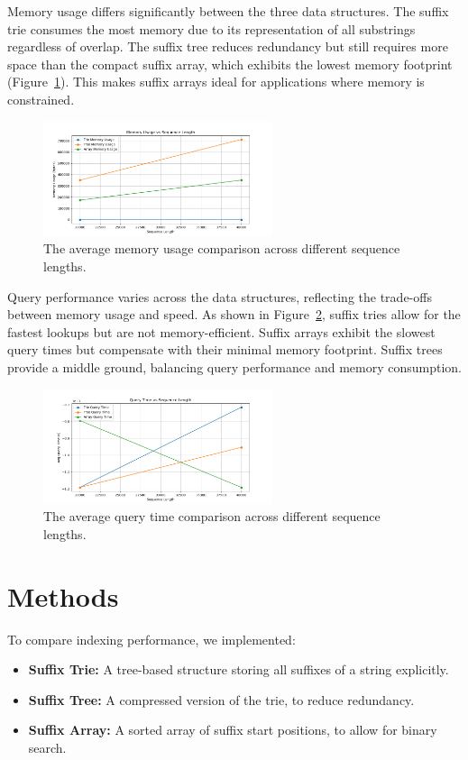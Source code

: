 \documentclass[11pt, letterpaper]{article}
\begin{document}
Memory usage differs significantly between the three data structures. The 
suffix trie consumes the most memory due to its representation of 
all substrings regardless of overlap. The suffix tree reduces redundancy but 
still requires more space than the compact suffix array, which exhibits the 
lowest memory footprint (Figure~\ref{memoryusage}). This makes suffix arrays 
ideal for applications where memory is constrained.

\begin{figure}[ht] \centering
\includegraphics[width=0.6\textwidth]{memory_usage.png}
\caption{The average memory usage comparison across different sequence lengths.}
\label{memoryusage}
\end{figure}

Query performance varies across the data structures, reflecting the trade-offs 
between memory usage and speed. As shown in Figure~\ref{querytime}, suffix tries 
allow for the fastest lookups but are not memory-efficient. Suffix arrays exhibit 
the slowest query times but compensate with their minimal memory footprint. Suffix 
trees provide a middle ground, balancing query performance and memory consumption.

\begin{figure}[ht] \centering
\includegraphics[width=0.6\textwidth]{query_time.png}
\caption{The average query time comparison across different sequence lengths.}
\label{querytime}
\end{figure}

\section{Methods}
To compare indexing performance, we implemented:
\begin{itemize}
\item \textbf{Suffix Trie:} A tree-based structure storing all suffixes of a string explicitly.
\item \textbf{Suffix Tree:} A compressed version of the trie, to reduce redundancy.
\item \textbf{Suffix Array:} A sorted array of suffix start positions, to allow for binary search.
\end{itemize}
\end{document}
